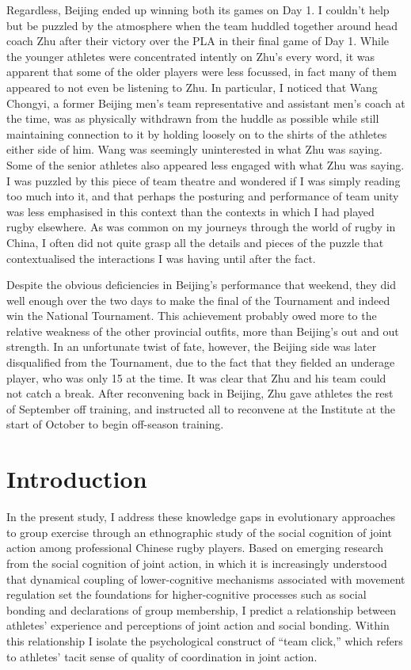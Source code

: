 \begin{CJK}{UTF8}{gbsn}
Regardless, Beijing ended up winning both its games on Day 1. I couldn't help but be puzzled by the atmosphere when the team huddled together around head coach Zhu after their victory over the PLA in their final game of Day 1.  While the younger athletes were concentrated intently on Zhu's every word, it was apparent that some of the older players were less focussed, in fact many of them appeared to not even be listening to Zhu.  In particular, I noticed that Wang Chongyi, a former Beijing men's team representative and assistant men's coach at the time, was as physically withdrawn from the huddle as possible while still maintaining connection to it by holding loosely on to the shirts of the athletes either side of him. Wang was seemingly uninterested in what Zhu was saying.  Some of the senior athletes also appeared less engaged with what Zhu was saying.  I was puzzled by this piece of team theatre and wondered if I was simply reading too much into it, and that perhaps the posturing and performance of team unity was less emphasised in this context than the contexts in which I had played rugby elsewhere. As was common on my journeys through the world of rugby in China, I often did not quite grasp all the details and pieces of the puzzle that contextualised the interactions I was having until after the fact.

Despite the obvious deficiencies in Beijing's performance that weekend, they did well enough over the two days to make the final of the Tournament and indeed win the National Tournament.  This achievement probably owed more to the relative weakness of the other provincial outfits, more than Beijing's out and out strength.  In an unfortunate twist of fate, however, the Beijing side was later disqualified from the Tournament, due to the fact that they fielded an underage player, who was only 15 at the time.  It was clear that Zhu and his team could not catch a break.  After reconvening back in Beijing, Zhu gave athletes the rest of September off training, and instructed all to reconvene at the Institute at the start of October to begin off-season training.



\section{Introduction}
In the present study, I address these knowledge gaps in evolutionary approaches to group exercise through an ethnographic study of the social cognition of joint action among professional Chinese rugby players.  Based on emerging research from the social cognition of joint action, in which it is increasingly understood that dynamical coupling of lower-cognitive mechanisms associated with movement regulation set the foundations for higher-cognitive processes such as social bonding and declarations of group membership, I predict a relationship between athletes' experience and perceptions of joint action and social bonding.  Within this relationship I isolate the psychological construct of ``team click,'' which refers to athletes' tacit sense of quality of coordination in joint action.


\end{CJK}
